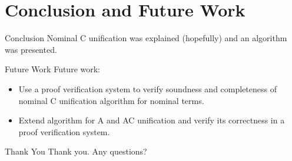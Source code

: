 \section{Conclusion and Future Work}

\begin{frame}{Conclusion}
    Nominal C unification was explained (hopefully) and an algorithm was presented.
\end{frame}

\begin{frame}{Future Work}
    Future work:  
    \begin{itemize}
        \item Use a proof verification system to verify soundness and completeness of
            nominal C unification algorithm for nominal terms.
        \item Extend algorithm for A and AC unification and verify its correctness in
            a proof verification system. 
    \end{itemize}
\end{frame}

\begin{frame}{Thank You}
    Thank you. Any questions?
\end{frame}
